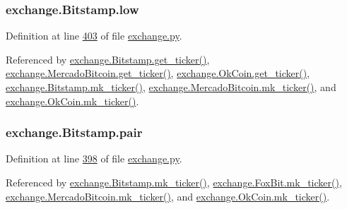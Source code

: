 \subsubsection[{\texorpdfstring{low}{low}}]{\setlength{\rightskip}{0pt plus 5cm}exchange.\+Bitstamp.\+low}\hypertarget{classexchange_1_1_bitstamp_a42d49d824732f16b57f677e8482e49b7}{}\label{classexchange_1_1_bitstamp_a42d49d824732f16b57f677e8482e49b7}


Definition at line \hyperlink{exchange_8py_source_l00403}{403} of file \hyperlink{exchange_8py_source}{exchange.\+py}.



Referenced by \hyperlink{exchange_8py_source_l00409}{exchange.\+Bitstamp.\+get\+\_\+ticker()}, \hyperlink{exchange_8py_source_l00543}{exchange.\+Mercado\+Bitcoin.\+get\+\_\+ticker()}, \hyperlink{exchange_8py_source_l00608}{exchange.\+Ok\+Coin.\+get\+\_\+ticker()}, \hyperlink{exchange_8py_source_l00423}{exchange.\+Bitstamp.\+mk\+\_\+ticker()}, \hyperlink{exchange_8py_source_l00557}{exchange.\+Mercado\+Bitcoin.\+mk\+\_\+ticker()}, and \hyperlink{exchange_8py_source_l00622}{exchange.\+Ok\+Coin.\+mk\+\_\+ticker()}.

\subsubsection[{\texorpdfstring{pair}{pair}}]{\setlength{\rightskip}{0pt plus 5cm}exchange.\+Bitstamp.\+pair}\hypertarget{classexchange_1_1_bitstamp_adf1f8e926f0cedb79bf57ab2dfa31776}{}\label{classexchange_1_1_bitstamp_adf1f8e926f0cedb79bf57ab2dfa31776}


Definition at line \hyperlink{exchange_8py_source_l00398}{398} of file \hyperlink{exchange_8py_source}{exchange.\+py}.



Referenced by \hyperlink{exchange_8py_source_l00423}{exchange.\+Bitstamp.\+mk\+\_\+ticker()}, \hyperlink{exchange_8py_source_l00482}{exchange.\+Fox\+Bit.\+mk\+\_\+ticker()}, \hyperlink{exchange_8py_source_l00557}{exchange.\+Mercado\+Bitcoin.\+mk\+\_\+ticker()}, and \hyperlink{exchange_8py_source_l00622}{exchange.\+Ok\+Coin.\+mk\+\_\+ticker()}.

